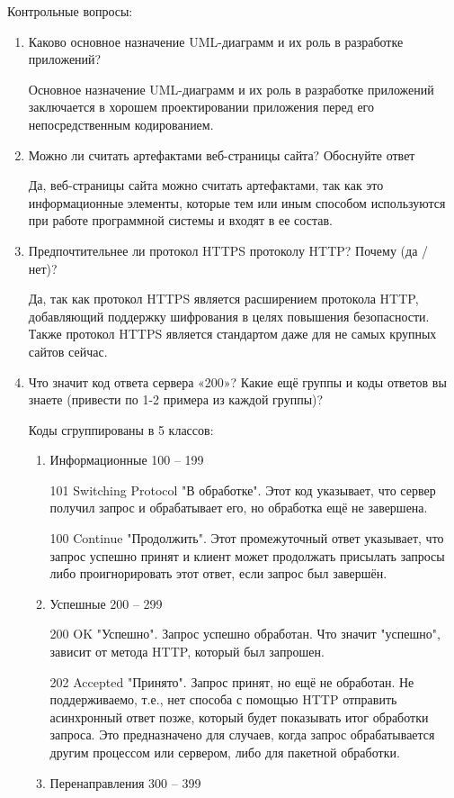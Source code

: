 \documentclass[14pt]{extarticle}
\begin{document}
Контрольные вопросы:
\begin{enumerate}
\item Каково основное назначение UML-диаграмм и их роль в разработке приложений?

Основное назначение UML-диаграмм и их роль в разработке приложений заключается в хорошем проектировании приложения перед его непосредственным кодированием.
\item Можно ли считать артефактами веб-страницы сайта? Обоснуйте ответ

Да, веб-страницы сайта можно считать артефактами, так как это информационные элементы, которые тем или иным способом используются при работе программной системы и входят в ее состав.
\item Предпочтительнее ли протокол HTTPS протоколу HTTP? Почему (да / нет)?

Да, так как протокол HTTPS является расширением протокола HTTP, добавляющий поддержку шифрования в целях повышения безопасности. Также протокол HTTPS является стандартом даже для не самых крупных сайтов сейчас.
\item Что значит код ответа сервера «200»? Какие ещё группы и коды ответов вы знаете (привести по 1-2 примера из каждой группы)?

Коды сгруппированы в 5 классов:
\begin{enumerate}
\item Информационные 100 – 199

101 Switching Protocol "В обработке". Этот код указывает, что сервер получил запрос и обрабатывает его, но обработка ещё не завершена.

100 Continue "Продолжить". Этот промежуточный ответ указывает, что запрос успешно принят и клиент может продолжать присылать запросы либо проигнорировать этот ответ, если запрос был завершён.

\item Успешные 200 – 299

200 OK "Успешно". Запрос успешно обработан. Что значит "успешно", зависит от метода HTTP, который был запрошен.

202 Accepted "Принято". Запрос принят, но ещё не обработан. Не поддерживаемо, т.е., нет способа с помощью HTTP отправить асинхронный ответ позже, который будет показывать итог обработки запроса. Это предназначено для случаев, когда запрос обрабатывается другим процессом или сервером, либо для пакетной обработки.

\item Перенаправления 300 – 399


\end{enumerate}
\end{enumerate}
\end{document}
